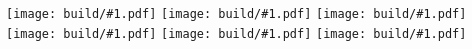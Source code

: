 \documentclass{article}
\newcommand{\Include}[1]{\texttt{[image: build/\#1.pdf]}\vspace{1cm}}
\begin{document}
\centering


\Include{abend-wird-es-wieder}
\Include{kein-schoener-land}
\Include{klinge-lieblich}
\Include{wenn-alle-bruennlein-fliessen}
\Include{wenn-ich-ein-voeglein-waer}
\Include{wohlauf-in-gottes-schoene-welt}
\end{document}
